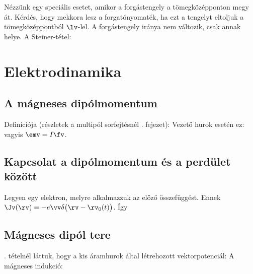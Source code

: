    Nézzünk egy speciális esetet, amikor a forgástengely a tömegközépponton megy át.
   Kérdés, hogy mekkora lesz a forgatónyomaték, ha ezt a tengelyt eltoljuk a tömegközéppontból $\lv$-lel.
   A forgástengely iránya nem változik, csak annak helye.
   A Steiner-tétel:
   
 \section{Elektrodinamika}
  
  \subsection{A mágneses dipólmomentum}
  
  Definíciója (részletek a multipól sorfejtésnél . fejezet): 
  Vezető hurok esetén ez:
  vagyis $\emv=I\fv$. 
  
 \subsection{Kapcsolat a dipólmomentum és a perdület között}
  
  Legyen egy elektron, melyre alkalmazzuk az előző összefüggést.
   Ennek $\Jv(\rv)=-e\vv\delta\big(\rv-\rv_0(t)\big)$. Így
  
  \subsection{Mágneses dipól tere}
  . tételnél láttuk, hogy a kis áramhurok által létrehozott vektorpotenciál:
  A mágneses indukció:
  
